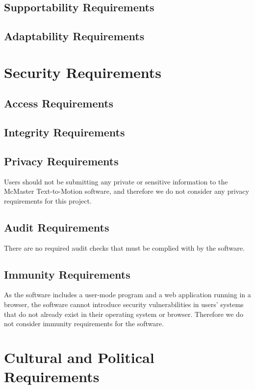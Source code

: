 \documentclass{scrreprt}
\begin{document}
\subsection{Supportability Requirements}

\subsection{Adaptability Requirements}

\section{Security Requirements}

\subsection{Access Requirements}

\subsection{Integrity Requirements}

\subsection{Privacy Requirements}

Users should not be submitting any private or sensitive information to the
McMaster Text-to-Motion software, and therefore we do not consider any privacy
requirements for this project.

\subsection{Audit Requirements}

There are no required audit checks that must be complied with by the software.

\subsection{Immunity Requirements}

As the software includes a user-mode program and a web application running in a
browser, the software cannot introduce security vulnerabilities in users'
systems that do not already exist in their operating system or browser.
Therefore we do not consider immunity requirements for the software.

\section{Cultural and Political Requirements}
\end{document}
